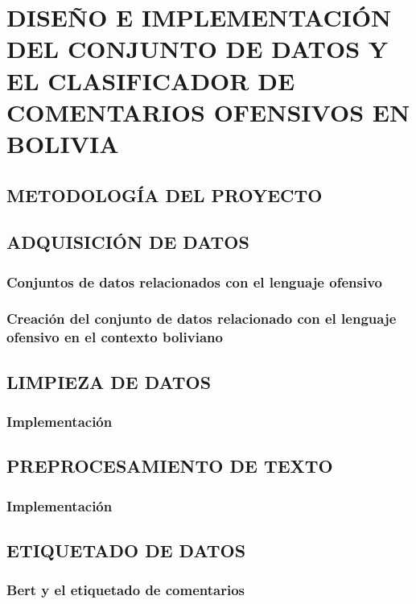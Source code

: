 \chapter{DISEÑO E IMPLEMENTACIÓN DEL CONJUNTO DE DATOS Y EL CLASIFICADOR DE COMENTARIOS OFENSIVOS EN BOLIVIA}\label{chp-resfttx}

\section{ METODOLOGÍA DEL PROYECTO}

\section{ADQUISICIÓN DE DATOS}

\subsection{Conjuntos de datos relacionados con el lenguaje ofensivo}

\subsection{Creación del conjunto de datos relacionado con el lenguaje ofensivo en el contexto boliviano}

\section{LIMPIEZA DE DATOS}

\subsection{Implementación}

\section{PREPROCESAMIENTO DE TEXTO}

\subsection{Implementación}

\section{ETIQUETADO DE DATOS}

\subsection{Bert y el etiquetado de comentarios}

